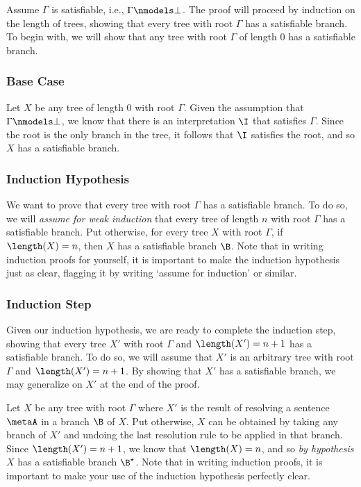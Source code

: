 Assume $\Gamma$ is satisfiable, i.e., $\Gamma \nmodels \bot$.
The proof will proceed by induction on the length of trees, showing that every tree with root $\Gamma$ has a satisfiable branch.
To begin with, we will show that any tree with root $\Gamma$ of length $0$ has a satisfiable branch.




\subsubsection{Base Case}

Let $X$ be any tree of length $0$ with root $\Gamma$.
Given the assumption that $\Gamma \nmodels \bot$, we know that there is an interpretation $\I$ that satisfies $\Gamma$.
Since the root is the only branch in the tree, it follows that $\I$ satisfies the root, and so $X$ has a satisfiable branch. 





\subsubsection{Induction Hypothesis}

We want to prove that every tree with root $\Gamma$ has a satisfiable branch.
To do so, we will \textit{assume for weak induction} that every tree of length $n$ with root $\Gamma$ has a satisfiable branch. 
Put otherwise, for every tree $X$ with root $\Gamma$, if $\length(X) = n$, then $X$ has a satisfiable branch $\B$. 
Note that in writing induction proofs for yourself, it is important to make the induction hypothesis just as clear, flagging it by writing `assume for induction' or similar.



\subsubsection{Induction Step}

Given our induction hypothesis, we are ready to complete the induction step, showing that every tree $X'$ with root $\Gamma$ and $\length(X')=n+1$ has a satisfiable branch.
To do so, we will assume that $X'$ is an arbitrary tree with root $\Gamma$ and $\length(X')=n+1$.
By showing that $X'$ has a satisfiable branch, we may generalize on $X'$ at the end of the proof.

Let $X$ be any tree with root $\Gamma$ where $X'$ is the result of resolving a sentence $\metaA$ in a branch $\B$ of $X$.
Put otherwise, $X$ can be obtained by taking any branch of $X'$ and undoing the last resolution rule to be applied in that branch. 
Since $\length(X')=n+1$, we know that $\length(X)=n$, and so \textit{by hypothesis} $X$ has a satisfiable branch $\B^\star$. 
Note that in writing induction proofs, it is important to make your use of the induction hypothesis perfectly clear.

